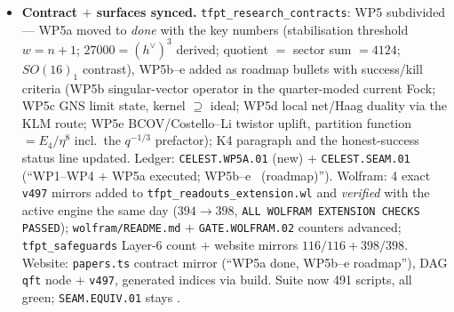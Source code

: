 \begin{itemize}[leftmargin=1.5em]
$5304\neq14^3$ (the $h^{\vee\,3}$ identity is not generic), quotient $2076=\Theta_{D_8}/\eta^8$ at
$q^2$ (the recipe validated on a second algebra), block weights $(0,\tfrac12,1,1)$ break one-block
fusion (vs $E_8$'s integer $(0,1,1,1)$); only $P=4=|\mu_4|$ periodisation reproduces the 248 layer;
swapped glue breaks the zero-mode anchor ($64\neq60$). \emph{Honest} \mO: the limit does \emph{not}
generate the truncation --- the singular vector as an \emph{operator} in the limit net (WP5b), the GNS
limit state (WP5c) and local normality/Haag duality (WP5d) stay open; the celestial route now has the
same two-step shape as MMST (limit $+$ maximal ideal), with the ideal quantitatively fixed;
\texttt{SEAM.EQUIV.01} untouched.
\item \textbf{Contract $+$ surfaces synced.} \texttt{tfpt\_research\_contracts}: WP5 subdivided ---
WP5a moved to \emph{done} with the key numbers (stabilisation threshold $w=n{+}1$; $27000=(h^\vee)^3$
derived; quotient $=$ sector sum $=4124$; $SO(16)_1$ contrast), WP5b--e added as roadmap bullets with
success/kill criteria (WP5b singular-vector operator in the quarter-moded current Fock; WP5c GNS limit
state, kernel $\supseteq$ ideal; WP5d local net/Haag duality via the KLM route; WP5e BCOV/Costello--Li
twistor uplift, partition function $=E_4/\eta^8$ incl.\ the $q^{-1/3}$ prefactor); K4 paragraph and the
honest-success status line updated. Ledger: \texttt{CELEST.WP5A.01} (new) $+$ \texttt{CELEST.SEAM.01}
(``WP1--WP4 $+$ WP5a executed; WP5b--e \mO\ (roadmap)''). Wolfram: 4 exact \texttt{v497} mirrors added
to \texttt{tfpt\_readouts\_extension.wl} and \emph{verified} with the active engine the same day
($394\to398$, \texttt{ALL WOLFRAM EXTENSION CHECKS PASSED}); \texttt{wolfram/README.md} $+$
\texttt{GATE.WOLFRAM.02} counters advanced; \texttt{tfpt\_safeguards} Layer-6 count $+$ website mirrors
$116/116+398/398$. Website: \texttt{papers.ts} contract mirror (``WP5a done, WP5b--e roadmap''), DAG
\texttt{qft} node $+$ \texttt{v497}, generated indices via build. Suite now 491 scripts, all green;
\texttt{SEAM.EQUIV.01} stays \mO.
\end{itemize}

